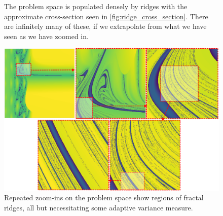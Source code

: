 \begin{figure}[ht]
    \centering
    \hfill
    \caption{The problem space is populated densely by ridges with the approximate cross-section seen in \cref{fig:ridge_cross_section}. There are infinitely many of these, if we extrapolate from what we have seen as we have zoomed in.}
\end{figure}

\begin{figure}[ht]
    \centering
    \includegraphics[width=\linewidth]{fig/consecutivezoom.png}
    \caption{Repeated zoom-ins on the problem space show regions of fractal ridges, all but necessitating some adaptive variance measure. }
    \label{fig:consecutivezoom}
\end{figure} 

